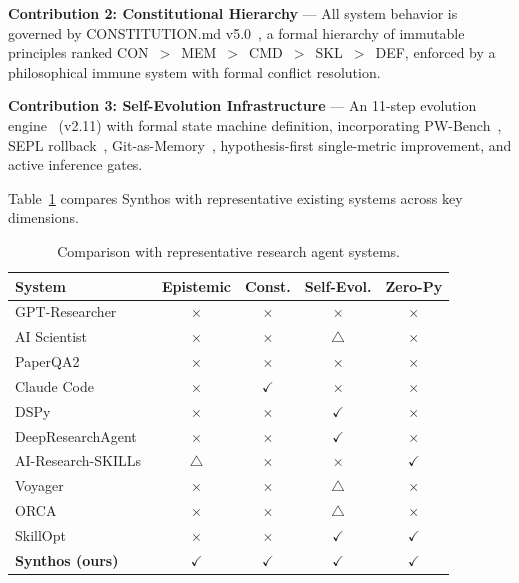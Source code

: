 \documentclass[review]{elsarticle}
\begin{document}
\textbf{Contribution 2: Constitutional Hierarchy} --- All system behavior is governed by CONSTITUTION.md v5.0~\cite{yang2026synthosconst}, a formal hierarchy of immutable principles ranked CON~$>$~MEM~$>$~CMD~$>$~SKL~$>$~DEF, enforced by a philosophical immune system with formal conflict resolution.

\textbf{Contribution 3: Self-Evolution Infrastructure} --- An 11-step evolution engine~\cite{yang2026synthos} (v2.11) with formal state machine definition, incorporating PW-Bench~\cite{song2026paperorchestra}, SEPL rollback~\cite{skyworkai2026deep}, Git-as-Memory~\cite{haiyang2025aris}, hypothesis-first single-metric improvement, and active inference gates.

Table~\ref{tab:comparison} compares Synthos with representative existing systems across key dimensions.

\begin{table}[h]\centering\caption{Comparison with representative research agent systems.}\label{tab:comparison}
\small
\begin{tabular}{lcccc}\toprule
\textbf{System} & \textbf{Epistemic} & \textbf{Const.} & \textbf{Self-Evol.} & \textbf{Zero-Py}\\\midrule
GPT-Researcher~\cite{elovic2024gpt} & $\times$ & $\times$ & $\times$ & $\times$\\
AI Scientist~\cite{sakana2025ai} & $\times$ & $\times$ & $\bigtriangleup$ & $\times$\\
PaperQA2~\cite{futurehouse2025paperqa2} & $\times$ & $\times$ & $\times$ & $\times$\\
Claude Code~\cite{anthropic2025claude} & $\times$ & $\checkmark$ & $\times$ & $\times$\\ 
DSPy~\cite{khattab2023dspy} & $\times$ & $\times$ & $\checkmark$ & $\times$\\
DeepResearchAgent~\cite{skyworkai2026deep} & $\times$ & $\times$ & $\checkmark$ & $\times$\\
AI-Research-SKILLs~\cite{orchestra2026airesearch} & $\bigtriangleup$ & $\times$ & $\times$ & $\checkmark$\\
Voyager~\cite{wang2023voyager} & $\times$ & $\times$ & $\bigtriangleup$ & $\times$\\
ORCA~\cite{mukherjee2023orca} & $\times$ & $\times$ & $\bigtriangleup$ & $\times$\\
SkillOpt~\cite{yang2026skillopt} & $\times$ & $\times$ & $\checkmark$ & $\checkmark$\\
\textbf{Synthos (ours)} & $\checkmark$ & $\checkmark$ & $\checkmark$ & $\checkmark$\\\bottomrule
\end{tabular}
\end{table}
\end{document}
